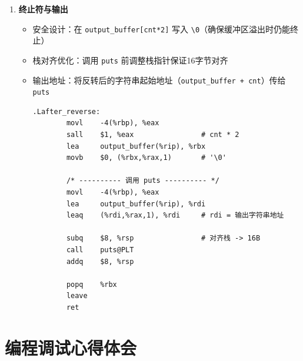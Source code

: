 \documentclass[10pt,a4paper]{article}
\begin{document}
\begin{enumerate}
    \item \textbf{终止符与输出}
    \begin{itemize}
        \item 安全设计：在 \verb|output_buffer[cnt*2]| 写入 \verb|\0|（确保缓冲区溢出时仍能终止）
        \item 栈对齐优化：调用 \verb|puts| 前调整栈指针保证16字节对齐
        \item 输出地址：将反转后的字符串起始地址（\verb|output_buffer + cnt|）传给 \verb|puts|
        \begin{lstlisting}[language={[x86masm]Assembler}]
.Lafter_reverse:
        movl    -4(%rbp), %eax
        sall    $1, %eax                # cnt * 2
        lea     output_buffer(%rip), %rbx
        movb    $0, (%rbx,%rax,1)       # '\0'

        /* ---------- 调用 puts ---------- */
        movl    -4(%rbp), %eax
        lea     output_buffer(%rip), %rdi
        leaq    (%rdi,%rax,1), %rdi     # rdi = 输出字符串地址

        subq    $8, %rsp                # 对齐栈 -> 16B
        call    puts@PLT
        addq    $8, %rsp

        popq    %rbx
        leave
        ret
        \end{lstlisting}
    \end{itemize}
\end{enumerate}

\section{编程调试心得体会}
\end{document}
